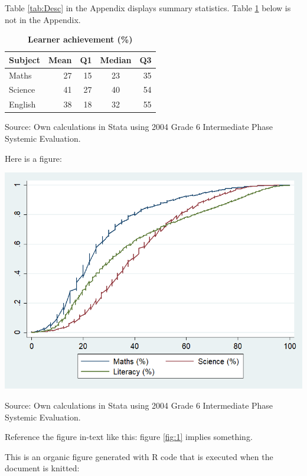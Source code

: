 \documentclass[12pt,preprint, authoryear]{article}
\let\origfigure\figure
\let\endorigfigure\endfigure
\renewenvironment{figure}[1][2] {
    \expandafter\origfigure\expandafter[H]
} {
    \endorigfigure
}
\numberwithin{equation}{section}
\numberwithin{figure}{section}
\numberwithin{table}{section}
\begin{document}
Table \ref{tab:Desc} in the Appendix displays summary statistics. Table
\ref{tab:Dep} below is not in the Appendix.

\footnotesize
\renewcommand{\thetable}{\arabic{table}}

\begin{longtable} {@{} l r r c r @{}} \caption{\textbf{Learner achievement (\%)}}
\label{tab:Dep}\\ \hline \hline
Subject & Mean & Q1 & Median & Q3 \\
\hline
Maths&      27& 15&   23&  35\\
Science&    41& 27&   40&  54\\
English&   38& 18&   32&  55\\ \hline \hline
\end{longtable}\begin{center} Source: Own calculations in Stata using 2004 Grade 6 Intermediate Phase Systemic Evaluation.\end{center}

\normalsize

\newpage

Here is a figure:

\setcounter{figure}{0} \renewcommand{\thefigure}{\arabic{figure}}

\begin{figure}
\caption{\textbf{\footnotesize Cumulative graph for subject scores}}
\label{fig:1}

\begin{center}\includegraphics[width=0.4\linewidth]{./Results/Graphs/figure} \end{center}
\centering
{\footnotesize Source: Own calculations in Stata using 2004 Grade 6 Intermediate Phase Systemic Evaluation.}
\end{figure}

\normalsize

Reference the figure in-text like this: figure \ref{fig:1} implies
something.

This is an organic figure generated with R code that is executed when
the document is knitted:
\end{document}
